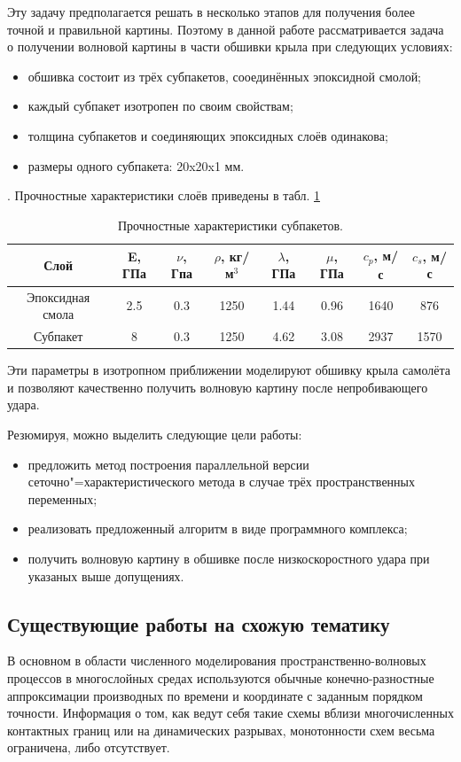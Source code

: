 Эту задачу предполагается решать в несколько этапов для получения более точной и
правильной картины. Поэтому в данной работе рассматривается задача о получении
волновой картины в части обшивки крыла при следующих условиях:
\begin{itemize}
\item обшивка состоит из трёх субпакетов, сооединённых эпоксидной смолой;
\item каждый субпакет изотропен по своим свойствам;
\item толщина субпакетов и соединяющих эпоксидных слоёв одинакова;
\item размеры одного субпакета: 20x20x1 мм.
\end{itemize}.
Прочностные характеристики слоёв приведены в табл. \ref{tbl:subpackage}
\begin{table}
\centering
\begin{tabular}{|c|c|c|c|c|c|c|c|}
\hline
Слой & E, ГПа & $\nu$, Гпа & $\rho$, кг/м$^{3}$ & $\lambda$, ГПа & $\mu$, ГПа &
$c_p$, м/с & $c_s$, м/с \\
\hline
Эпоксидная смола & 2.5 & 0.3 & 1250 & 1.44 & 0.96 & 1640 & 876 \\
Субпакет & 8 & 0.3 & 1250 & 4.62 & 3.08 & 2937 & 1570 \\
\hline
\end{tabular}
\caption{Прочностные характеристики субпакетов.}
\label{tbl:subpackage}
\end{table}
Эти параметры в изотропном приближении моделируют обшивку крыла самолёта и
позволяют качественно получить волновую картину после непробивающего удара.

Резюмируя, можно выделить следующие цели работы:
\begin{itemize}
\item предложить метод построения параллельной версии сеточно"=характеристического метода в случае трёх пространственных переменных;
\item реализовать предложенный алгоритм в виде программного комплекса;
\item получить волновую картину в обшивке после низкоскоростного удара при
указаных выше допущениях.
\end{itemize}

\subsection*{Существующие работы на схожую тематику}
В основном в области численного моделирования пространственно-волновых процессов в многослойных средах используются обычные конечно-разностные аппроксимации производных по времени и координате с заданным порядком точности. Информация о том, как ведут себя такие схемы вблизи многочисленных контактных границ или на динамических разрывах, монотонности схем весьма ограничена, либо отсутствует.

